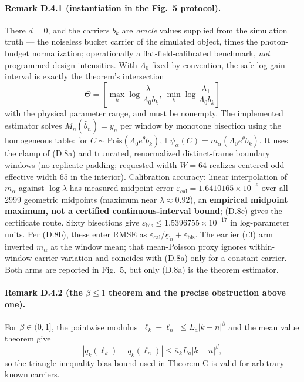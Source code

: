 \paragraph{Remark D.4.1 (instantiation in the Fig.~5 protocol).} There $d=0$, and the carriers $b_k$ are \emph{oracle} values supplied from the simulation truth --- the noiseless bucket carrier of the simulated object, times the photon-budget normalization; operationally a flat-field-calibrated benchmark, \emph{not} programmed design intensities. With $\Lambda_0$ fixed by convention, the safe log-gain interval is exactly the theorem's intersection
\[
\Theta=\left[\max_k\log\frac{\lambda_-}{\Lambda_0b_k},\ \min_k\log\frac{\lambda_+}{\Lambda_0b_k}\right]
\]
with the physical parameter range, and must be nonempty. The implemented estimator solves $M_n(\hat\theta_n)=y_n$ per window by monotone bisection using the homogeneous table: for $C\sim\mathrm{Pois}(\Lambda_0e^\theta b_k)$, $\mathbb E\psi_\alpha(C)=m_\alpha(\Lambda_0e^\theta b_k)$. It uses the clamp of (D.8a) and truncated, renormalized distinct-frame boundary windows (no replicate padding; requested width $W=64$ realizes centered odd effective width $65$ in the interior). Calibration accuracy: linear interpolation of $m_\alpha$ against $\log\lambda$ has measured midpoint error $\varepsilon_{\mathrm{cal}}=1.6410165\times10^{-6}$ over all 2999 geometric midpoints (maximum near $\lambda\approx0.92$), an \textbf{empirical midpoint maximum, not a certified continuous-interval bound}; (D.8c) gives the certificate route. Sixty bisections give $\varepsilon_{\mathrm{bis}}\le1.5396755\times10^{-17}$ in log-parameter units. Per (D.8b), these enter RMSE as $\varepsilon_{\mathrm{cal}}/\underline\kappa_n+\varepsilon_{\mathrm{bis}}$. The earlier (r3) arm inverted $m_\alpha$ at the window mean; that mean-Poisson proxy ignores within-window carrier variation and coincides with (D.8a) only for a constant carrier. Both arms are reported in Fig.~5, but only (D.8a) is the theorem estimator.

\paragraph{Remark D.4.2 (the $\beta\le1$ theorem and the precise
obstruction above one).}
For $\beta\in(0,1]$, the pointwise modulus
$|\ell_k-\ell_n|\le L_a|k-n|^\beta$ and the mean value theorem give
\[
|q_k(\ell_k)-q_k(\ell_n)|\le\overline\kappa_kL_a|k-n|^\beta,
\]
so the triangle-inequality bias bound used in Theorem C is valid for
arbitrary known carriers.

